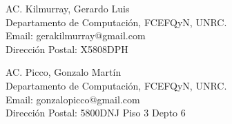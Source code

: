 \documentclass[%
 	final,
%
	notitlepage,
	narroweqnarray,
	inline,
 	twoside,
	]{ieee}
\begin{document}

\begin{biography}{AC. Kilmurray, Gerardo Luis}\\
Departamento de Computaci\'on, FCEFQyN, UNRC.\\
Email: gerakilmurray@gmail.com\\
Direcci\'on Postal: X5808DPH \\
\end{biography}


\begin{biography}{AC. Picco, Gonzalo Mart\'in}\\
Departamento de Computaci\'on, FCEFQyN, UNRC.\\
Email: gonzalopicco@gmail.com\\
Direcci\'on Postal: 5800DNJ Piso 3 Depto 6 \\
\end{biography}
\end{document}
